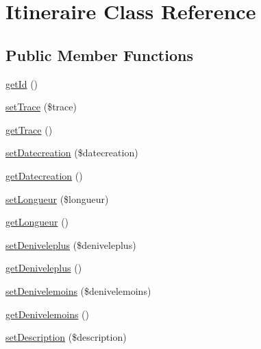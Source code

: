 \hypertarget{class_site_1_1_trail_bundle_1_1_entity_1_1_itineraire}{}\section{Itineraire Class Reference}
\label{class_site_1_1_trail_bundle_1_1_entity_1_1_itineraire}
\subsection*{Public Member Functions}
\begin{DoxyCompactItemize}
\item 
\hyperlink{class_site_1_1_trail_bundle_1_1_entity_1_1_itineraire_a12251d0c022e9e21c137a105ff683f13}{get\+Id} ()
\item 
\hyperlink{class_site_1_1_trail_bundle_1_1_entity_1_1_itineraire_a85a736fc0736634963f247671e1e5e4b}{set\+Trace} (\$trace)
\item 
\hyperlink{class_site_1_1_trail_bundle_1_1_entity_1_1_itineraire_aea32915a3e3df1032825f2369d490aad}{get\+Trace} ()
\item 
\hyperlink{class_site_1_1_trail_bundle_1_1_entity_1_1_itineraire_a1749554fae4c73cc3836b9ac2f02c73e}{set\+Datecreation} (\$datecreation)
\item 
\hyperlink{class_site_1_1_trail_bundle_1_1_entity_1_1_itineraire_a586442e7ccf6b3534c0a3813b4a164e7}{get\+Datecreation} ()
\item 
\hyperlink{class_site_1_1_trail_bundle_1_1_entity_1_1_itineraire_ade304605d2cd28ec81435dbce9310149}{set\+Longueur} (\$longueur)
\item 
\hyperlink{class_site_1_1_trail_bundle_1_1_entity_1_1_itineraire_a456e9d5a3f048cc8f438206ab87a6cba}{get\+Longueur} ()
\item 
\hyperlink{class_site_1_1_trail_bundle_1_1_entity_1_1_itineraire_ac21cc7335429569d4ff4a6915c1c393c}{set\+Deniveleplus} (\$deniveleplus)
\item 
\hyperlink{class_site_1_1_trail_bundle_1_1_entity_1_1_itineraire_aad1dfb2f3af6e62ccd35545be95ef171}{get\+Deniveleplus} ()
\item 
\hyperlink{class_site_1_1_trail_bundle_1_1_entity_1_1_itineraire_a07ee687afdd8f0e15593e2208edec45f}{set\+Denivelemoins} (\$denivelemoins)
\item 
\hyperlink{class_site_1_1_trail_bundle_1_1_entity_1_1_itineraire_a63ac30f87a9c2e3dc8ab98572fc598bd}{get\+Denivelemoins} ()
\item 
\hyperlink{class_site_1_1_trail_bundle_1_1_entity_1_1_itineraire_a31fad3e39336ea079ea758e051866627}{set\+Description} (\$description)

\end{DoxyCompactItemize}
